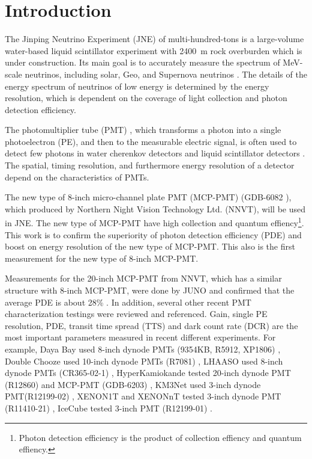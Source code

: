 \section{Introduction}
The Jinping Neutrino Experiment (JNE) of multi-hundred-tons is a large-volume water-based liquid scintillator experiment with \SI{2400}{m} rock overburden \cite{LetterJNE2017} which is under construction. Its main goal is to accurately measure the spectrum of MeV-scale neutrinos, including solar, Geo, and Supernova neutrinos \cite{LetterJNE2017}. The details of the energy spectrum of neutrinos of low energy is determined by the energy resolution, which is dependent on the coverage of light collection and photon detection efficiency.

The photomultiplier tube (PMT) \cite{HAMAMATSUManual}, which transforms a photon into a single photoelectron (PE), and then to the measurable electric signal, is often used to detect few photons in water cherenkov detectors \cite{SNO,SuperK} and liquid scintillator detectors \cite{KamLAND,JUNO:2015zny}. The spatial, timing resolution, and furthermore energy resolution of a detector depend on the characteristics of PMTs.

The new type of 8-inch micro-channel plate PMT (MCP-PMT) (GDB-6082 \cite{GDB-6082}), which produced by Northern Night Vision Technology Ltd. (NNVT), will be used in JNE. The new type of MCP-PMT have high collection and quantum effiency\footnote{Photon detection efficiency is the product of collection effiency and quantum effiency.}. This work is to confirm the superiority of photon detection efficiency (PDE) and boost on energy resolution of the new type of MCP-PMT. This also is the first measurement for the new type of 8-inch MCP-PMT.

Measurements for the 20-inch MCP-PMT from NNVT, which has a similar structure with 8-inch MCP-PMT, were done by JUNO and confirmed that the average PDE is about 28\% \cite{JUNOMassTesting}. In addition, several other recent PMT characterization testings were reviewed and referenced. Gain, single PE resolution, PDE, transit time spread (TTS) and dark count rate (DCR) are the most important parameters measured in recent different experiments. For example, Daya Bay used 8-inch dynode PMTs (9354KB, R5912, XP1806) \cite{DayaBayTesting}, Double Chooze used 10-inch dynode PMTs (R7081) \cite{DoubleChoozeTesting}, LHAASO used 8-inch dynode PMTs (CR365-02-1) \cite{LHAASOTesting}, HyperKamiokande tested 20-inch dynode PMT (R12860) and MCP-PMT (GDB-6203) \cite{HyperKTesting}, KM3Net used 3-inch dynode PMT(R12199-02) \cite{KM3NetTesting}, XENON1T and XENONnT tested 3-inch dynode PMT (R11410-21) \cite{XENON1TTesting}\cite{XENONnTTesting}, IceCube tested 3-inch PMT (R12199-01) \cite{IceCubeTesting}.

